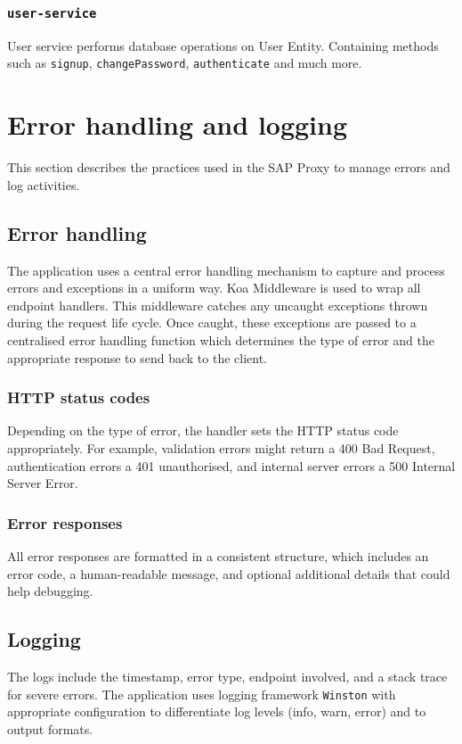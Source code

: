 \subsubsection{\texttt{user-service}}
User service performs database operations on User Entity. 
Containing methods such as \texttt{signup}, \texttt{changePassword}, \texttt{authenticate} and much more.


\section{Error handling and logging}
This section describes the practices used in the SAP Proxy to manage errors and log activities.

\subsection{Error handling}
The application uses a central error handling mechanism to capture and process errors and exceptions in a uniform way.
Koa Middleware is used to wrap all endpoint handlers.
This middleware catches any uncaught exceptions thrown during the request life cycle.
Once caught, these exceptions are passed to a centralised error handling function which determines the type of error and the appropriate response to send back to the client.

\subsubsection{HTTP status codes}
Depending on the type of error, the handler sets the HTTP status code appropriately. 
For example, validation errors might return a 400 Bad Request, authentication errors a 401 unauthorised, and internal server errors a 500 Internal Server Error.

\subsubsection{Error responses}
All error responses are formatted in a consistent structure, which includes an error code, a human-readable message, and optional additional details that could help debugging.

\subsection{Logging}
The logs include the timestamp, error type, endpoint involved, and a stack trace for severe errors.
The application uses logging framework \texttt{Winston} with appropriate configuration to differentiate log levels (info, warn, error) and to output formats.